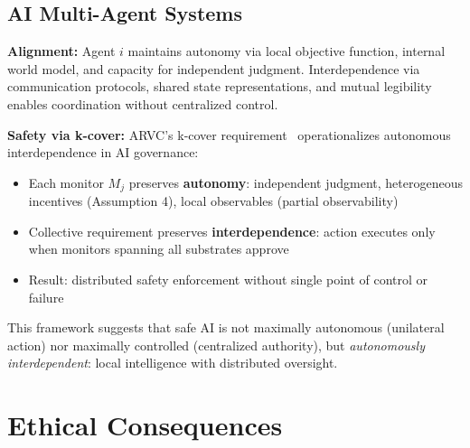 \documentclass[11pt,a4paper]{article}
\begin{document}
\subsection{AI Multi-Agent Systems}

\textbf{Alignment:} Agent $i$ maintains autonomy via local objective function, internal world model, and capacity for independent judgment. Interdependence via communication protocols, shared state representations, and mutual legibility enables coordination without centralized control.

\textbf{Safety via k-cover:} ARVC's k-cover requirement~\cite{arvc} operationalizes autonomous interdependence in AI governance:
\begin{itemize}
    \item Each monitor $M_j$ preserves \textbf{autonomy}: independent judgment, heterogeneous incentives (Assumption 4), local observables (partial observability)
    \item Collective requirement preserves \textbf{interdependence}: action executes only when monitors spanning all substrates approve
    \item Result: distributed safety enforcement without single point of control or failure
\end{itemize}

This framework suggests that safe AI is not maximally autonomous (unilateral action) nor maximally controlled (centralized authority), but \emph{autonomously interdependent}: local intelligence with distributed oversight.

\section{Ethical Consequences}
\end{document}
